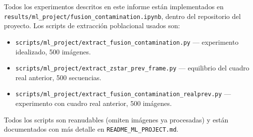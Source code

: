 \documentclass[11pt,a4paper]{article}
\newcommand{\code}[1]{\texttt{#1}}
\begin{document}
Todos los experimentos descritos en este informe están implementados en
\code{results/ml\_project/fusion\_contamination.ipynb}, dentro del repositorio del proyecto. Los
scripts de extracción poblacional usados son:
\begin{itemize}
  \item \code{scripts/ml\_project/extract\_fusion\_contamination.py} --- experimento idealizado,
    500 imágenes.
  \item \code{scripts/ml\_project/extract\_zstar\_prev\_frame.py} --- equilibrio del cuadro real
    anterior, 500 secuencias.
  \item \code{scripts/ml\_project/extract\_fusion\_contamination\_realprev.py} --- experimento con
    cuadro real anterior, 500 imágenes.
\end{itemize}
Todos los scripts son reanudables (omiten imágenes ya procesadas) y están documentados con más
detalle en \code{README\_ML\_PROJECT.md}.
\end{document}
